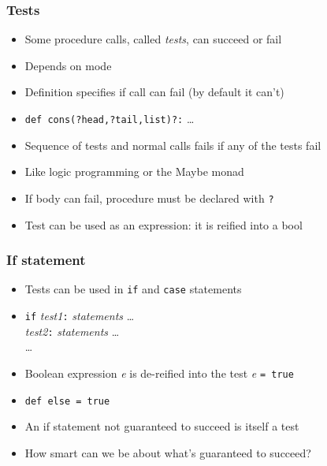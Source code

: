 \documentclass[12pt]{beamer}
\begin{document}
\begin{frame}
\frametitle{Tests}
\begin{itemize}
\item Some procedure calls, called \emph{tests}, can succeed or fail
\item Depends on mode
\item Definition specifies if call can fail (by default it can't)
\item \texttt{def cons(?head,?tail,list)?:} \ldots
\item Sequence of tests and normal calls fails if any of the tests fail
\item Like logic programming or the Maybe monad
\item If body can fail, procedure must be declared with \texttt{?}
\item Test can be used as an expression:  it is reified into a bool
\end{itemize}
\end{frame}


\begin{frame}
\frametitle{If statement}
\begin{itemize}
\item Tests can be used in \texttt{if} and \texttt{case} statements
\item \texttt{if} \emph{test1}\texttt{:} \emph{statements} \ldots \\
\hspace*{1em} \emph{test2}\texttt{:} \emph{statements} \ldots \\
\hspace*{1em} \ldots \\
\item Boolean expression \emph{e} is de-reified into the test \emph{e}
  \texttt{= true}
\item \texttt{def else = true}
\item An if statement not guaranteed to succeed is itself a test
\item How smart can we be about what's guaranteed to succeed?
\end{itemize}
\end{frame}
\end{document}
